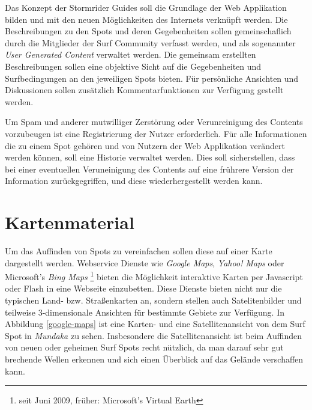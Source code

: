 Das Konzept der Stormrider Guides soll die Grundlage der Web
Applikation bilden und mit den neuen Möglichkeiten des Internets
verknüpft werden. Die Beschreibungen zu den Spots und deren
Gegebenheiten sollen gemeinschaflich durch die Mitglieder der Surf
Community verfasst werden, und als sogenannter \textit{User Generated
  Content} verwaltet werden. Die gemeinsam erstellten Beschreibungen
sollen eine objektive Sicht auf die Gegebenheiten und Surfbedingungen
an den jeweiligen Spots bieten. Für persönliche Ansichten und
Diskussionen sollen zusätzlich Kommentarfunktionen zur Verfügung
gestellt werden.

Um Spam und anderer mutwilliger Zerstörung oder Verunreinigung des
Contents vorzubeugen ist eine Registrierung der Nutzer
erforderlich. Für alle Informationen die zu einem Spot gehören und von
Nutzern der Web Applikation verändert werden können, soll eine
Historie verwaltet werden. Dies soll sicherstellen, dass bei einer
eventuellen Veruneinigung des Contents auf eine frührere Version der
Information zurückgegriffen, und diese wiederhergestellt werden kann.

\section{Kartenmaterial}

Um das Auffinden von Spots zu vereinfachen sollen diese auf einer
Karte dargestellt werden. Webservice Dienste wie \textit{Google Maps},
\textit{Yahoo! Maps} oder Microsoft's \textit{Bing Maps}
\footnote{seit Juni 2009, früher: Microsoft's Virtual Earth} bieten
die Möglichkeit interaktive Karten per Java\-script oder Flash in eine
Webseite einzubetten. Diese Dienste bieten nicht nur die typischen
Land- bzw. Straßenkarten an, sondern stellen auch Satelitenbilder und
teilweise 3-dimensionale Ansichten für bestimmte Gebiete zur
Verfügung. In Abbildung \ref{google-maps} ist eine Karten- und eine
Satellitenansicht von dem Surf Spot in \textit{Mundaka} zu
sehen. Insbesondere die Satellitenansicht ist beim Auffinden von neuen
oder geheimen Surf Spots recht nützlich, da man darauf sehr gut
brechende Wellen erkennen und sich einen Überblick auf das Gelände
verschaffen kann.

